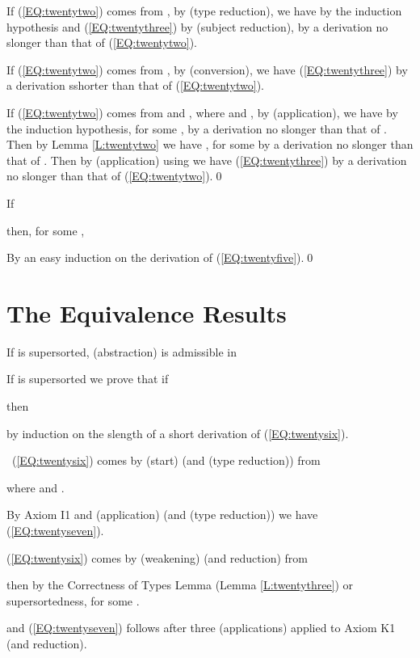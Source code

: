 \documentclass{LMCS}
\begin{document}
\begin{thm}
{  If (\ref{EQ:twentytwo}) comes from , by
  (type reduction), we have  by the induction
  hypothesis and (\ref{EQ:twentythree}) by (subject reduction), by a
  derivation no slonger than that of (\ref{EQ:twentytwo}).

  If (\ref{EQ:twentytwo}) comes from , by
  (conversion), we have (\ref{EQ:twentythree}) by a derivation
  sshorter than that of (\ref{EQ:twentytwo}).

  If (\ref{EQ:twentytwo}) comes from  and , where  and
  , by (application), we have by the induction
  hypothesis,  for some , by a derivation no slonger than that of . Then by Lemma \ref{L:twentytwo} we have
  , for some  by a derivation no slonger than that of . Then by (application) using  we have (\ref{EQ:twentythree}) by a derivation no
  slonger than that of (\ref{EQ:twentytwo}).\qed

\begin{lem}\label{L:twentyfour}
  If 

  then, for some ,

\end{lem}

\proof By an easy induction on the derivation of (\ref{EQ:twentyfive}).\qed

\section{The Equivalence Results}\label{S:ER}

\begin{lem}\label{L:twentyfive}
  If  is supersorted, (abstraction) is
  admissible in 
\end{lem}

\proof If  is supersorted we prove that if

  then

  by induction on the slength of a short derivation of (\ref{EQ:twentysix}).

\ (\ref{EQ:twentysix}) comes by (start) (and (type reduction)) from

  where  and .

  By Axiom I1 and (application) (and (type reduction)) we have (\ref{EQ:twentyseven}).

 (\ref{EQ:twentysix}) comes by (weakening) (and reduction) from

  then by the Correctness of Types Lemma (Lemma \ref{L:twentythree}) or
  supersortedness, for some .

  and (\ref{EQ:twentyseven}) follows after three (applications) applied to Axiom K1 (and
  reduction).

}
\end{thm}
\end{document}
